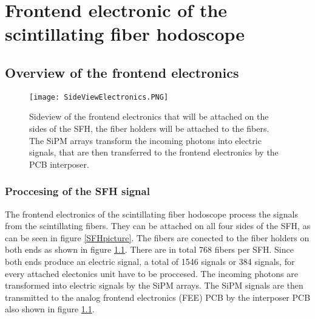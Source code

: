 \chapter{Frontend electronic of the scintillating fiber hodoscope}\label{cha:frontend}
\section{Overview of the frontend electronics}
\begin{figure}[h]
    \centering
    \texttt{[image: SideViewElectronics.PNG]}
    \caption{Sideview of the frontend electronics that will be attached on the sides of the SFH, the fiber holders will be attached to the fibers.
     The SiPM arrays transform the incoming photons into  electric signals, that are then transferred to the frontend electronics by the PCB interposer.\autocite{InternalcommunicationKarl}}
    \label{fig:SideviewModelElectronics}
    \end{figure}
\subsection{Proccesing of the SFH signal}
The frontend electronics of the scintillating fiber hodoscope process the signals from the scintillating fibers.
They can be attached on all four sides of the SFH, as can be seen in figure \ref{SFHpicture}.
The fibers are conected to the fiber holders on both ends as shown in figure \ref{fig:SideviewModelElectronics}. 
There are in total 768\autocite{Amber2022Status} fibers per SFH. Since both ends produce an electric signal,
 a total of 1546 signals or 384 signals, for every attached electonics unit have to be proccesed.
 \newline
 The incoming photons are transformed into electric signals by the SiPM arrays.
 The SiPM signals are then transmitted to the analog frontend electronics (FEE) PCB by the interposer PCB also shown in figure \ref{fig:SideviewModelElectronics}.\autocite{InternalcommunicationKarl}
